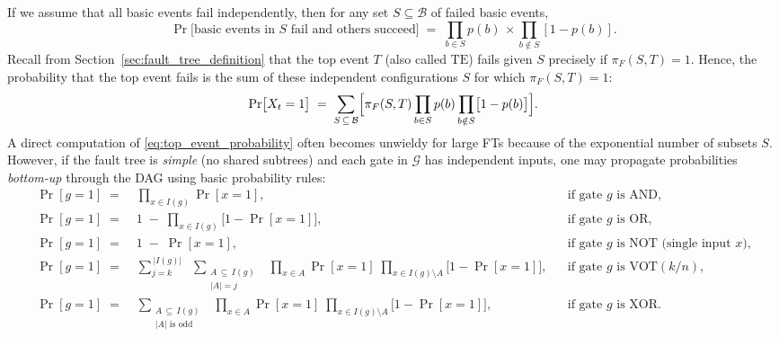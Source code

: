 If we assume that all basic events fail independently, then for any set \(S \subseteq \mathcal{B}\) of failed basic events,
\[
\Pr\bigl[\text{basic events in }S\text{ fail and others succeed}\bigr]
\;=\;
\prod_{b \in S} p(b)\,\times\!\!\prod_{b \notin S} [1 - p(b)].
\]
Recall from Section~\ref{sec:fault_tree_definition} that the top event \(T\) (also called \(\mathrm{TE}\)) fails given \(S\) precisely if \(\pi_F(S, T)=1\).  Hence, the probability that the top event fails is the sum of these independent configurations \(S\) for which \(\pi_F(S,T)=1\):
\begin{equation}
\label{eq:top_event_probability}
\Pr\bigl[X_t=1\bigr]
\;=\;
\sum_{S\,\subseteq\,\mathcal{B}}
\Bigl[
    \pi_F(S,T)
    \prod_{b \in S} p(b)
    \prod_{b \notin S} \bigl[1 - p(b)\bigr]
\Bigr].
\end{equation}
A direct computation of \eqref{eq:top_event_probability} often becomes unwieldy for large FTs because of the exponential number of subsets \(S\).  However, if the fault tree is \emph{simple} (no shared subtrees) and each gate in \(\mathcal{G}\) has independent inputs, one may propagate probabilities \emph{bottom-up} through the DAG using basic probability rules:
\[
\begin{aligned}
\Pr[g=1] \;=\;& \prod_{x \in I(g)} \Pr[x=1],
&&\text{if gate \(g\) is AND,}\\[6pt]
\Pr[g=1] \;=\;& 1 \;-\; \prod_{x \in I(g)}\bigl[1-\Pr[x=1]\bigr],
&&\text{if gate \(g\) is OR,}\\[6pt]
\Pr[g=1] \;=\;& 1 \;-\; \Pr[x=1],
&&\text{if gate \(g\) is NOT (single input \(x\)),}\\[6pt]
\Pr[g=1] \;=\;& \displaystyle \sum_{j=k}^{\,|I(g)|}
\;\;\sum_{\substack{A\,\subseteq\,I(g)\\|A|=j}}
\;\;\prod_{x\in A}\Pr[x=1]\;\prod_{x\in I(g)\setminus A}\bigl[1-\Pr[x=1]\bigr],
&&\text{if gate \(g\) is \(\mathrm{VOT}(k/n)\),}\\[6pt]
\Pr[g=1] \;=\;& \displaystyle \sum_{\substack{A\,\subseteq\,I(g)\\\text{\(|A|\) is odd}}}
\;\;\prod_{x\in A}\Pr[x=1]\;\prod_{x\in I(g)\setminus A}\bigl[1-\Pr[x=1]\bigr],
&&\text{if gate \(g\) is XOR.}
\end{aligned}
\]

